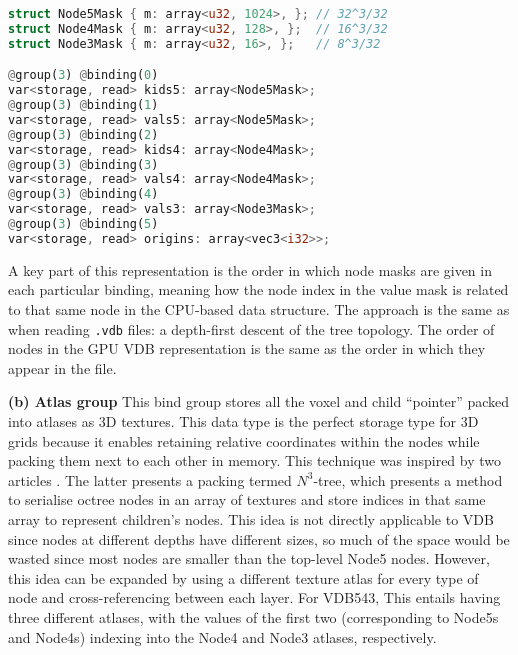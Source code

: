 \begin{lstlisting}[language=rust, captionpos=b, caption={
    wgsl version of the mask arrays. Each buffer is divided into parts based on the size of the node it tackles. This enables getting all the masks of a node with a particular index by simply indexing them into the mask array. For example, \texttt{kids5[0]} would give the first child mask for the Node5 at index 0.
}]
struct Node5Mask { m: array<u32, 1024>, }; // 32^3/32
struct Node4Mask { m: array<u32, 128>, };  // 16^3/32
struct Node3Mask { m: array<u32, 16>, };   // 8^3/32

@group(3) @binding(0)
var<storage, read> kids5: array<Node5Mask>;
@group(3) @binding(1)
var<storage, read> vals5: array<Node5Mask>;
@group(3) @binding(2)
var<storage, read> kids4: array<Node4Mask>;
@group(3) @binding(3)
var<storage, read> vals4: array<Node4Mask>;
@group(3) @binding(4)
var<storage, read> vals3: array<Node3Mask>;
@group(3) @binding(5)
var<storage, read> origins: array<vec3<i32>>;
\end{lstlisting}
    A key part of this representation is the order in which node masks are given in each particular binding, meaning how the node index in the value mask is related to that same node in the CPU-based data structure. The approach is the same as when reading \texttt{.vdb} files: a depth-first descent of the tree topology. The order of nodes in the GPU VDB representation is the same as the order in which they appear in the file.


\textbf{(b) Atlas group} This bind group stores all the voxel and child ``pointer'' packed into atlases as 3D textures. This data type is the perfect storage type for 3D grids because it enables retaining relative coordinates within the nodes while packing them next to each other in memory. This technique was inspired by two articles \cite{octree:1,octree:2}. The latter presents a packing termed $N^{3}$-tree, which presents a method to serialise octree nodes in an array of textures and store indices in that same array to represent children's nodes. This idea is not directly applicable to VDB since nodes at different depths have different sizes, so much of the space would be wasted since most nodes are smaller than the top-level Node5 nodes. However, this idea can be expanded by using a different texture atlas for every type of node and cross-referencing between each layer. For VDB543, This entails having three different atlases, with the values of the first two (corresponding to Node5s and Node4s) indexing into the Node4 and Node3 atlases, respectively.

